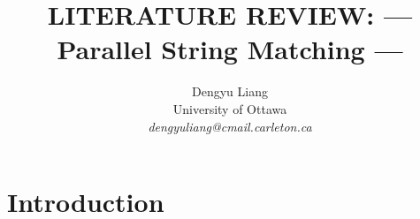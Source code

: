 \documentclass[11pt]{article}       %
\begin{document}


\title{LITERATURE REVIEW: --- Parallel String Matching ---}


\author{
Dengyu Liang\\
University of Ottawa\\
{\em dengyuliang@cmail.carleton.ca}
} %

\maketitle





\section{Introduction} \label{intro}
\end{document}
